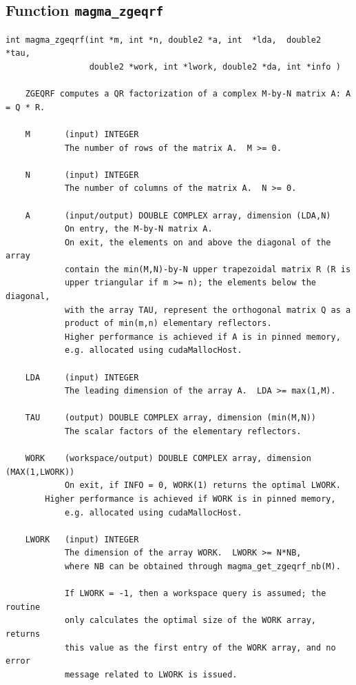 \documentclass[10pt]{book}
\begin{document}
\newpage
\subsection{Function {\tt {\bf magma\_zgeqrf}}}
\begin{verbatim}
int magma_zgeqrf(int *m, int *n, double2 *a, int  *lda,  double2  *tau,
                 double2 *work, int *lwork, double2 *da, int *info )
   
    ZGEQRF computes a QR factorization of a complex M-by-N matrix A: A = Q * R.   

    M       (input) INTEGER   
            The number of rows of the matrix A.  M >= 0.   

    N       (input) INTEGER   
            The number of columns of the matrix A.  N >= 0.   

    A       (input/output) DOUBLE COMPLEX array, dimension (LDA,N)   
            On entry, the M-by-N matrix A.   
            On exit, the elements on and above the diagonal of the array   
            contain the min(M,N)-by-N upper trapezoidal matrix R (R is   
            upper triangular if m >= n); the elements below the diagonal,   
            with the array TAU, represent the orthogonal matrix Q as a   
            product of min(m,n) elementary reflectors.   
            Higher performance is achieved if A is in pinned memory, 
            e.g. allocated using cudaMallocHost.

    LDA     (input) INTEGER   
            The leading dimension of the array A.  LDA >= max(1,M).   

    TAU     (output) DOUBLE COMPLEX array, dimension (min(M,N))   
            The scalar factors of the elementary reflectors.   

    WORK    (workspace/output) DOUBLE COMPLEX array, dimension (MAX(1,LWORK))   
            On exit, if INFO = 0, WORK(1) returns the optimal LWORK.   
	    Higher performance is achieved if WORK is in pinned memory, 
            e.g. allocated using cudaMallocHost.

    LWORK   (input) INTEGER   
            The dimension of the array WORK.  LWORK >= N*NB, 
            where NB can be obtained through magma_get_zgeqrf_nb(M).   

            If LWORK = -1, then a workspace query is assumed; the routine   
            only calculates the optimal size of the WORK array, returns   
            this value as the first entry of the WORK array, and no error   
            message related to LWORK is issued.


\end{verbatim}
\end{document}
